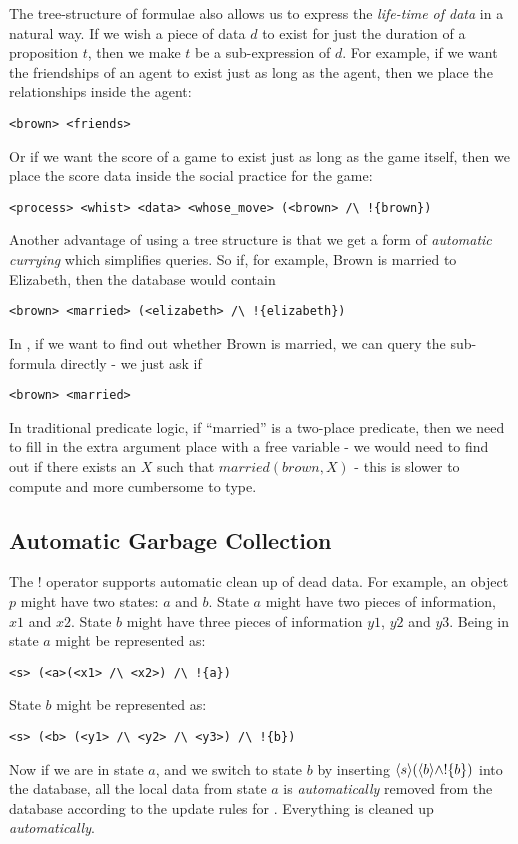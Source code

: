 The tree-structure of formulae also allows us to express the \emph{life-time of data} in a natural way. 
If we wish a piece of data $d$ to exist for just the duration of a proposition $t$, then we make $t$ be a sub-expression of $d$. 
For example, if we want the friendships of an agent to exist just as long as the agent, then we place the relationships inside the agent: 
\begin{verbatim}
<brown> <friends>
\end{verbatim}
Or if we want the score of a game to exist just as long as the game itself, then we place the score data inside the social practice for the game: 
\begin{verbatim}
<process> <whist> <data> <whose_move> (<brown> /\ !{brown})
\end{verbatim}

Another advantage of using a tree structure is that we get a form of \emph{automatic currying} which simplifies queries.
So if, for example, Brown is married to Elizabeth, then the database would contain 
\begin{verbatim}
<brown> <married> (<elizabeth> /\ !{elizabeth})
\end{verbatim}
In \ELFULL{}, if we want to find out whether Brown is married, we can query the sub-formula directly -  we just ask if 
\begin{verbatim}
<brown> <married>
\end{verbatim}
In traditional predicate logic, if ``married'' is a two-place predicate, then we need to fill in the extra argument place with a free variable - we would need to find out if there exists an $X$ such that $married(brown, X)$ - this is slower to compute and more cumbersome to type. 

\subsection{Automatic Garbage Collection}
The $!$ operator supports automatic clean up of dead data.
For example, an object $p$ might have two states: $a$ and $b$. State $a$ might have two pieces of information, $x1$ and $x2$. State $b$ might have three pieces of information $y1$, $y2$ and $y3$. Being in state $a$ might be represented as:
\begin{verbatim}
<s> (<a>(<x1> /\ <x2>) /\ !{a})
\end{verbatim}
State $b$ might be represented as:
\begin{verbatim}
<s> (<b> (<y1> /\ <y2> /\ <y3>) /\ !{b})
\end{verbatim}
Now if we are in state $a$, and we switch to state $b$ by inserting $\langle s \rangle (\langle b \rangle \land !\{b\})$ into the database, all the local data from  state $a$ is \emph{automatically} removed from the database according to the update rules for \ELFULL{}. Everything is cleaned up \emph{automatically}.


